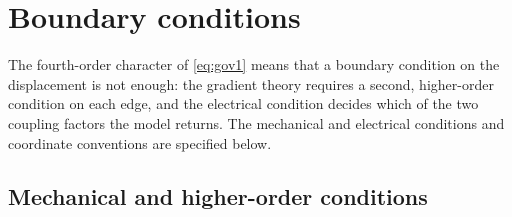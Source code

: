 \FloatBarrier
\section{Boundary conditions}
\label{sec:bc}

The fourth-order character of \eqref{eq:gov1} means that a boundary condition
on the displacement is not enough: the gradient theory requires a second,
higher-order condition on each edge, and the electrical condition decides
which of the two coupling factors the model returns. The mechanical and electrical conditions and coordinate conventions are
specified below.

\FloatBarrier
\subsection{Mechanical and higher-order conditions}
\label{sec:bc_mech}

